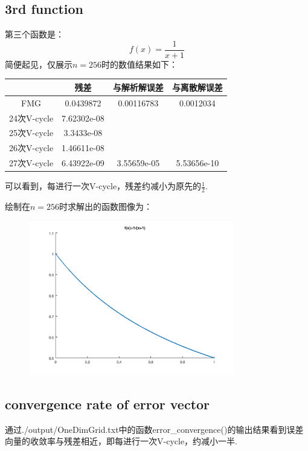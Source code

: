 \documentclass[a4paper,11.5pt,UTF8]{ctexart}
\begin{document}
\begin{large}
\subsection{3rd function}
\par 第三个函数是：$$f(x)=\frac{1}{x+1}$$
简便起见，仅展示$n=256$时的数值结果如下：
\begin{center}
	\begin{tabular}{|c|c|c|c|}
		\hline
		& 残差 & 与解析解误差 & 与离散解误差 \\
		\hline
		FMG & 0.0439872 & 0.00116783 & 0.0012034 \\
		\hline
		24次V-cycle & 7.62302e-08 & ~ & ~ \\
		\hline
		25次V-cycle & 3.3433e-08 & ~ & ~ \\
		\hline
		26次V-cycle & 1.46611e-08 & ~ & ~ \\
		\hline
		27次V-cycle & 6.43922e-09 & 3.55659e-05 & 5.53656e-10 \\
		\hline
	\end{tabular}
\end{center}
可以看到，每进行一次V-cycle，残差约减小为原先的$\frac{1}{2}$.
\par 绘制在$n=256$时求解出的函数图像为：
\begin{figure}[H]
	\centering
	\includegraphics[width=0.8\textwidth,height=0.6\textwidth]{../output/figure/dim1_3.png}
\end{figure}

\subsection{convergence rate of error vector}
通过./output/OneDimGrid.txt中的函数error\_convergence()的输出结果看到误差向量的收敛率与残差相近，即每进行一次V-cycle，约减小一半.


\end{large}
\end{document}

